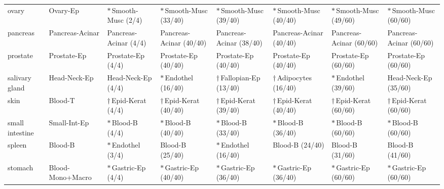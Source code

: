 \begin{table}[t]
{\begin{tabular}{llllllll}
ovary & Ovary-Ep & \cellcolor{blue!12}$\ast$\,Smooth-Musc (2/4) & \cellcolor{blue!12}$\ast$\,Smooth-Musc (33/40) & \cellcolor{blue!12}$\ast$\,Smooth-Musc (39/40) & \cellcolor{blue!12}$\ast$\,Smooth-Musc (40/40) & \cellcolor{blue!12}$\ast$\,Smooth-Musc (49/60) & \cellcolor{blue!12}$\ast$\,Smooth-Musc (60/60) \\
pancreas & Pancreas-Acinar & \cellcolor{teal!15}Pancreas-Acinar (4/4) & \cellcolor{teal!15}Pancreas-Acinar (40/40) & \cellcolor{teal!15}Pancreas-Acinar (38/40) & \cellcolor{teal!15}Pancreas-Acinar (40/40) & \cellcolor{teal!15}Pancreas-Acinar (60/60) & \cellcolor{teal!15}Pancreas-Acinar (60/60) \\
prostate & Prostate-Ep & \cellcolor{teal!15}Prostate-Ep (4/4) & \cellcolor{teal!15}Prostate-Ep (40/40) & \cellcolor{teal!15}Prostate-Ep (40/40) & \cellcolor{teal!15}Prostate-Ep (40/40) & \cellcolor{teal!15}Prostate-Ep (60/60) & \cellcolor{teal!15}Prostate-Ep (60/60) \\
salivary gland & Head-Neck-Ep & \cellcolor{teal!15}Head-Neck-Ep (4/4) & \cellcolor{blue!12}$\ast$\,Endothel (16/40) & \cellcolor{magenta!15}$\dagger$\,Fallopian-Ep (13/40) & \cellcolor{magenta!15}$\dagger$\,Adipocytes (16/40) & \cellcolor{blue!12}$\ast$\,Endothel (39/60) & \cellcolor{teal!15}Head-Neck-Ep (35/60) \\
skin & Blood-T & \cellcolor{magenta!15}$\dagger$\,Epid-Kerat (4/4) & \cellcolor{magenta!15}$\dagger$\,Epid-Kerat (40/40) & \cellcolor{magenta!15}$\dagger$\,Epid-Kerat (39/40) & \cellcolor{magenta!15}$\dagger$\,Epid-Kerat (40/40) & \cellcolor{magenta!15}$\dagger$\,Epid-Kerat (60/60) & \cellcolor{magenta!15}$\dagger$\,Epid-Kerat (60/60) \\
small intestine & Small-Int-Ep & \cellcolor{blue!12}$\ast$\,Blood-B (4/4) & \cellcolor{blue!12}$\ast$\,Blood-B (40/40) & \cellcolor{blue!12}$\ast$\,Blood-B (33/40) & \cellcolor{blue!12}$\ast$\,Blood-B (36/40) & \cellcolor{blue!12}$\ast$\,Blood-B (60/60) & \cellcolor{blue!12}$\ast$\,Blood-B (60/60) \\
spleen & Blood-B & \cellcolor{blue!12}$\ast$\,Endothel (3/4) & \cellcolor{teal!15}Blood-B (25/40) & \cellcolor{blue!12}$\ast$\,Endothel (16/40) & \cellcolor{teal!15}Blood-B (24/40) & \cellcolor{teal!15}Blood-B (31/60) & \cellcolor{teal!15}Blood-B (41/60) \\
stomach & Blood-Mono+Macro & \cellcolor{blue!12}$\ast$\,Gastric-Ep (4/4) & \cellcolor{blue!12}$\ast$\,Gastric-Ep (40/40) & \cellcolor{blue!12}$\ast$\,Gastric-Ep (36/40) & \cellcolor{blue!12}$\ast$\,Gastric-Ep (36/40) & \cellcolor{blue!12}$\ast$\,Gastric-Ep (60/60) & \cellcolor{blue!12}$\ast$\,Gastric-Ep (60/60) \\

\end{tabular}}
\end{table}
